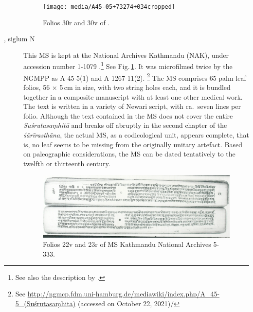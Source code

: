 \begin{description}
    
    
    \begin{figure}[t]
        \centering
        \texttt{[image: media/A45-05+73274+034cropped]}
        \caption{Folios 30r and 30v of .}
        \label{fig:a45-0573274044}
    \end{figure}
    
    \item[\MS{Kathmandu NAK 1-1079}, siglum N] This MS is kept at the National
    Archives Kathmandu (NAK), under accession number 1-1079 .\footnote{See also 
    the description by \citet[\S 2.2]{kleb-2021b}.} See
    Fig.\,\ref{fig:a45-0573274044}. It was microfilmed twice by the NGMPP as A
    45-5(1) and A 1267-11(2).%
    \footnote{%
    See 
    \url{http://ngmcp.fdm.uni-hamburg.de/mediawiki/index.php/A_45-5_(Suśrutasaṃhitā)} 
    (accessed on October 22, 2021)/ } The MS comprises 65 palm-leaf folios, 56 $\times$ 
    5\,cm in size, with two string holes each, and it is bundled together in a composite 
    manuscript with at least one other medical work. The text is written in a variety of 
    Newari script, with ca.\ seven lines per folio. Although the text contained in the MS 
    does not cover the entire \emph{Suśrutasaṃhitā} and breaks off abruptly in the 
    second chapter of the \emph{śārīrasthāna}, the actual MS, as a codicological unit, 
    appears complete, that is, no leaf seems to be missing from the originally unitary 
    artefact. Based on paleographic considerations, the MS can be dated tentatively to 
    the twelfth or thirteenth century.
    
    \begin{figure}[t]
        \centering
        \includegraphics[draft=false,width=1\linewidth]{"media/dscn2998 fol 022cropped"}
        \caption{Folios 22v and 23r of MS Kathmandu National Archives 5-333.}
        \label{fig:dscn2998-fol-022cropped}
    \end{figure}
    

\end{description}
